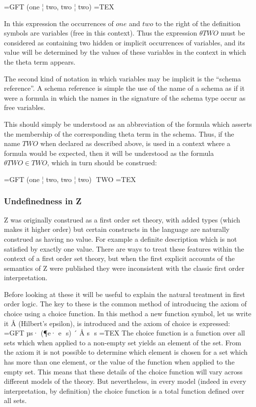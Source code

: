 \documentclass[10pt,titlepage]{book}
\begin{document}
=GFT
	(one ¦ two, two ¦ two)
=TEX

In this expression the occurrences of $one$ and $two$ to the right of the definition symbols are variables (free in this context).
Thus the expression ${\theta}TWO$ must be considered as containing two hidden or implicit occurrences of variables, and its value will be determined by the values of these variables in the context in which the theta term appears.

The second kind of notation in which variables may be implicit is the ``schema reference''.
A schema reference is simple the use of the name of a schema as if it were a formula in which the names in the signature of the schema type occur as free variables.

This should simply be understood as an abbreviation of the formula which asserts the membership of the corresponding theta term in the schema.
Thus, if the name $TWO$ when declared as described above, is used in a context where a formula would be expected, then it will be understood as the formula ${\theta}TWO \in TWO$, which in turn should be construed:

=GFT
	(one ¦ two, two ¦ two)  TWO
=TEX


\subsubsection{Undefinedness in Z}

Z was originally construed as a first order set theory, with added types (which makes it higher order) but certain constructs in the language are naturally construed as having no value.
For example a definite description which is not satisfied by exactly one value.
There are ways to treat these features within the context of a first order set theory, but when the first explicit accounts of the semantics of Z were published they were inconsistent with the classic first order interpretation.

Before looking at these it will be useful to explain the natural treatment in first order logic.
The key to these is the common method of introducing the axiom of choice using a choice function.
In this method a new function symbol, let us write it $Å$ (Hilbert's epsilon), is introduced and the axiom of choice is expressed:
=GFT
	µs· (¶e· e  s) ´ Å s  s	
=TEX
The choice function is a function over all sets which when applied to a non-empty set yields an element of the set.
From the axiom it is not possible to determine which element is chosen for a set which has more than one element, or the value of the function when applied to the empty set.
This means that these details of the choice function will vary across different models of the theory.
But nevertheless, in every model (indeed in every interpretation, by definition) the choice function is a total function defined over all sets.
\end{document}
